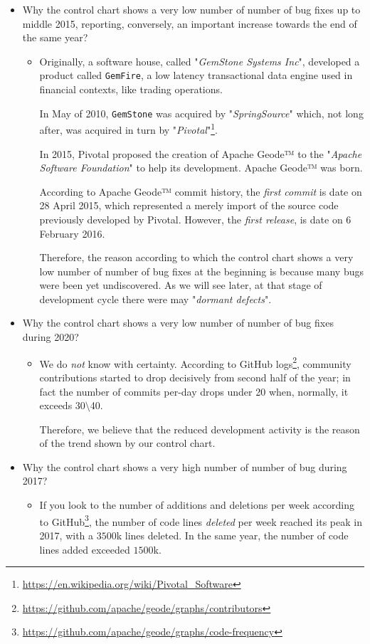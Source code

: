 \documentclass[sigconf]{acmart}
\begin{document}
\begin{itemize}
\item Why the control chart shows a very low number of number of bug fixes up to middle 2015, reporting, conversely, an important increase towards the end of the same year?
\begin{itemize}
\item Originally, a software house, called "\textit{GemStone Systems Inc}", developed a product called \texttt{GemFire}, a low latency transactional data engine used in financial contexts, like trading operations.

In May of 2010, \texttt{GemStone} was acquired by "\textit{SpringSource}" which, not long after, was acquired in turn by "\textit{Pivotal}"\footnote{\url{https://en.wikipedia.org/wiki/Pivotal_Software}}.

In 2015, Pivotal proposed the creation of Apache Geode™ to the "\textit{Apache Software Foundation}" to help its development. Apache Geode™ was born.

According to Apache Geode™ commit history, the \textit{first commit} is date on 28 April 2015, which represented a merely import of the source code previously developed by Pivotal. However, the \textit{first release}, is date on 6 February 2016.

Therefore, the reason according to which the control chart shows a very low number of number of bug fixes at the beginning is because many bugs were been yet undiscovered. As we will see later, at that stage of development cycle there were may "\textit{dormant defects}".
\end{itemize}

\item Why the control chart shows a very low number of number of bug fixes during 2020?
\begin{itemize}
\item We do \textit{not} know with certainty. According to GitHub logs\footnote{\url{https://github.com/apache/geode/graphs/contributors}}, community contributions started to drop decisively from second half of the year; in fact the number of commits per-day drops under 20 when, normally, it exceeds 30$\setminus$40. 

Therefore, we believe that the reduced development activity is the reason of the trend shown by our control chart.
\end{itemize}

\item Why the control chart shows a very high number of number of bug during 2017?
\begin{itemize}
\item If you look to the number of additions and deletions per week according to GitHub\footnote{\url{https://github.com/apache/geode/graphs/code-frequency}}, the number of code lines \textit{deleted} per week reached its peak in 2017, with a $3500$k lines deleted. In the same year, the number of code lines added exceeded $1500$k.


\end{itemize}
\end{itemize}
\end{document}
